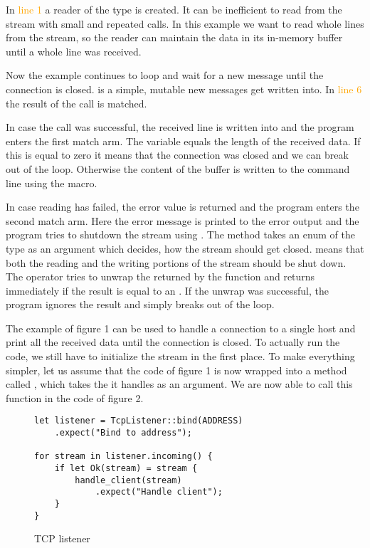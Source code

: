In \textcolor{orange}{line 1} a reader of the type  is created. It can be inefficient to read
from the stream with small and repeated calls. In this example we want to read whole lines from the stream, so the
reader can maintain the data in its in-memory buffer until a whole line was received.

Now the example continues to loop and wait for a new message until the connection is closed.  is a simple,
mutable  new messages get written into. In \textcolor{orange}{line 6} the result of the call
 is matched.

In case the call was successful, the received line is written into  and the program enters the first match
arm. The variable  equals the length of the received data. If this is equal to zero it means that the
connection was closed and we can break out of the loop. Otherwise the content of the buffer is written to the command
line using the  macro.

In case reading has failed, the error value is returned and the program enters the second match arm. Here the error
message is printed to the error output and the program tries to shutdown the stream using
. The method takes an enum of the type  as an argument which
decides, how the stream should get closed.  means that both the reading and the writing portions of the
stream should be shut down. The  operator tries to unwrap the  returned by the function and
returns immediately if the result is equal to an . If the unwrap was successful, the program ignores the
result and simply breaks out of the loop.

The example of figure 1 can be used to handle a connection to a single host and print all the received data until the
connection is closed. To actually run the code, we still have to initialize the stream in the first place. To make
everything simpler, let us assume that the code of figure 1 is now wrapped into a method called
, which takes the  it handles as an argument. We are now able to call this
function in the code of figure 2.

\begin{figure}[ht]
    \begin{verbatim}
let listener = TcpListener::bind(ADDRESS)
    .expect("Bind to address");

for stream in listener.incoming() {
    if let Ok(stream) = stream {
        handle_client(stream)
            .expect("Handle client");
    }
}
    \end{verbatim}
    \caption{TCP listener}
\end{figure}

